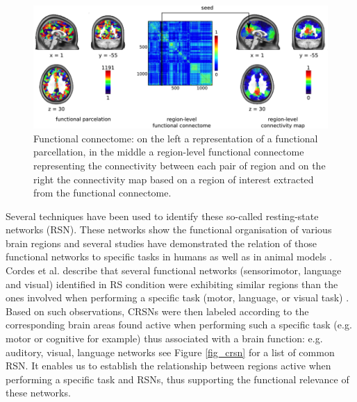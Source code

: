 \begin{figure}[H]
\begin{center}
\includegraphics[width=\linewidth]{../figures/connectome.png}
\end{center}
\caption[Functional connectome]
{Functional connectome: on the left a representation of a functional parcellation, in the middle a region-level functional connectome representing the connectivity between each pair of region and on the right the connectivity map based on a region of interest extracted from the functional connectome.}
\label{fig_connectome}
\end{figure}

Several techniques have been used to identify these so-called resting-state networks (RSN). These networks show the functional organisation of various brain regions and several studies have demonstrated the relation of those functional networks to specific tasks in humans as well as in animal models \citep{Biswal1995} \citep{Buckner2008} \citep{Greicius2009}. Cordes et al. describe that several functional networks (sensorimotor, language and visual) identified in RS condition were exhibiting similar regions than the ones involved when performing a specific task (motor, language, or visual task) \citep{Cordes2000}. Based on such observations, CRSNs were then labeled according to the corresponding brain areas found active when performing such a specific task (e.g. motor or cognitive for example) thus associated with a brain function: e.g. auditory, visual, language networks \citep{Cordes2000} see Figure \ref{fig_crsn} for a list of common RSN. It enables us to establish the relationship between regions active 
when 
performing a specific task and RSNs, thus supporting the functional relevance of these networks. 



